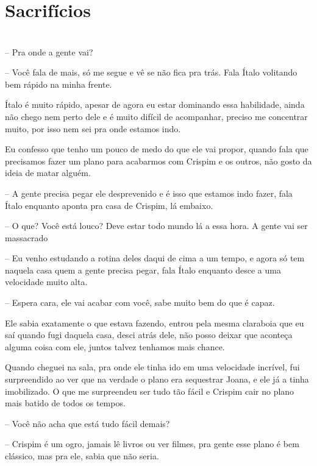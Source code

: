 
\newpage


\ifdefined\useChapters
\chapter{Sacrifícios}

\else
\chapter{}
\fi
-- Pra onde a gente vai?

-- Você fala de mais, só me segue e vê se não fica pra trás. Fala Ítalo volitando bem rápido na minha frente.

Ítalo é muito rápido, apesar de agora eu estar dominando essa habilidade, ainda não chego nem perto dele e é muito difícil de acompanhar, preciso me concentrar muito, por isso nem sei pra onde estamos indo.

Eu confesso que tenho um pouco de medo do que ele vai propor, quando fala que precisamos fazer um plano para acabarmos com Crispim e os outros, não gosto da ideia de matar alguém.

-- A gente precisa pegar ele desprevenido e é isso que estamos indo fazer, fala Ítalo enquanto aponta pra casa de Crispim, lá embaixo.

-- O que? Você está louco? Deve estar todo mundo lá a essa hora. A gente vai ser massacrado

-- Eu venho estudando a rotina deles daqui de cima a um tempo, e agora só tem naquela casa quem a gente precisa pegar, fala Ítalo enquanto desce a uma velocidade muito alta.

-- Espera cara, ele vai acabar com você, sabe muito bem do que é capaz.

Ele sabia exatamente o que estava fazendo, entrou pela mesma claraboia que eu saí quando fugi daquela casa, desci atrás dele, não posso deixar que aconteça alguma coisa com ele, juntos talvez tenhamos mais chance.

Quando cheguei na sala, pra onde ele tinha ido em uma velocidade incrível, fui surpreendido ao ver que na verdade o plano era sequestrar Joana, e ele já a tinha imobilizado. O que me surpreendeu ser tudo tão fácil e Crispim cair no plano mais batido de todos os tempos.

-- Você não acha que está tudo fácil demais?

-- Crispim é um ogro, jamais lê livros ou ver filmes, pra gente esse plano é bem clássico, mas pra ele, sabia que não seria.

